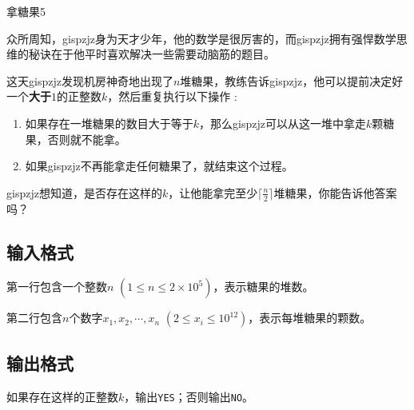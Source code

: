 \begin{Problem}{拿糖果}{5}

众所周知，gispzjz身为天才少年，他的数学是很厉害的，而gispzjz拥有强悍数学思维的秘诀在于他平时喜欢解决一些需要动脑筋的题目。

这天gispzjz发现机房神奇地出现了$n$堆糖果，教练告诉gispzjz，他可以提前决定好一个\textbf{大于}$1$的正整数$k$，然后重复执行以下操作 : 

\begin{enumerate}

\item 如果存在一堆糖果的数目大于等于$k$，那么gispzjz可以从这一堆中拿走$k$颗糖果，否则就不能拿。

\item 如果gispzjz不再能拿走任何糖果了，就结束这个过程。

\end{enumerate}

gispzjz想知道，是否存在这样的$k$，让他能拿完至少$\lceil \frac{n}{2} \rceil$堆糖果，你能告诉他答案吗？

\subsection*{输入格式}

第一行包含一个整数$n$ $(1 \leq n \leq 2 \times 10^5)$，表示糖果的堆数。

第二行包含$n$个数字$x_1, x_2, \cdots, x_n$ $(2 \leq x_i \leq 10^{12})$，表示每堆糖果的颗数。

\subsection*{输出格式}

如果存在这样的正整数$k$，输出\texttt{YES}；否则输出\texttt{NO}。



\end{Problem}

